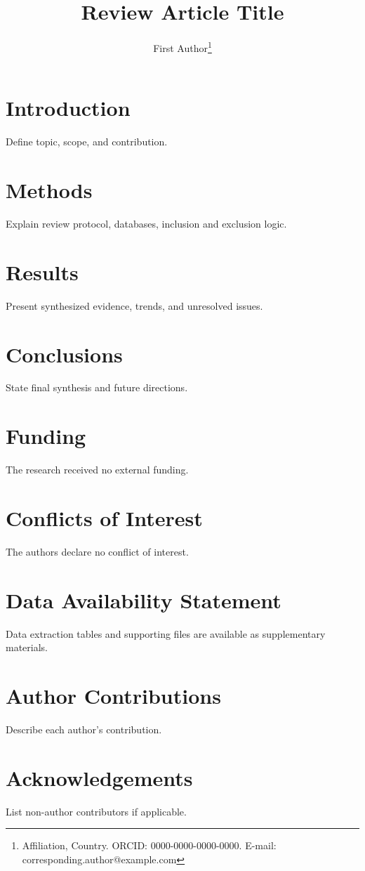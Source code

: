 \documentclass[12pt,a4paper]{article}
\title{Review Article Title}
\author{First Author\footnote{Affiliation, Country. ORCID: 0000-0000-0000-0000. E-mail: corresponding.author@example.com}}
\date{}
\begin{document}
\maketitle

\begin{sdqabstract}
\end{sdqabstract}


\section{Introduction}
Define topic, scope, and contribution.

\section{Methods}
Explain review protocol, databases, inclusion and exclusion logic.

\section{Results}
Present synthesized evidence, trends, and unresolved issues.

\section{Conclusions}
State final synthesis and future directions.

\section*{Funding}
The research received no external funding.

\section*{Conflicts of Interest}
The authors declare no conflict of interest.

\section*{Data Availability Statement}
Data extraction tables and supporting files are available as supplementary materials.

\section*{Author Contributions}
Describe each author's contribution.

\section*{Acknowledgements}
List non-author contributors if applicable.

\printbibliography[title={References}]
\end{document}
